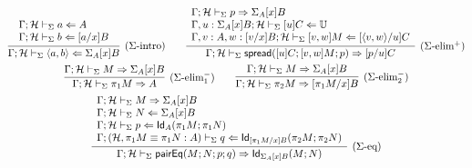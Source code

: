 \documentclass{amsart}
\begin{document}
\begin{gather*}
  \infer[\text{($\Sigma$-intro)}]{
    \Gamma;\mathcal{H}\vdash_\Sigma \langle a,b\rangle \checks \Sigma_A[x]B
  }{
    \begin{array}{l}
      \Gamma;\mathcal{H}\vdash_\Sigma a\checks A\\
      \Gamma;\mathcal{H}\vdash_\Sigma b\checks [a/x]B
    \end{array}
  }
  \qquad
  \infer[\text{($\Sigma$-elim$^+$)}]{
    \Gamma;\mathcal{H}\vdash_\Sigma \mathsf{spread}([u]C; [v,w]M; p)\infers [p/u]C
  }{
    \begin{array}{l}
      \Gamma;\mathcal{H}\vdash_\Sigma p\infers \Sigma_A[x]B\\
      \Gamma,u:\Sigma_A[x]B;\mathcal{H}\vdash_\Sigma [u]C\checks\uni\\
      \Gamma,v:A,w:[v/x]B;\mathcal{H}\vdash_\Sigma [v,w]M\checks[\langle v,w\rangle/u]C
    \end{array}
  }\\
  \infer[\text{($\Sigma$-elim$^-_1$)}]{
    \Gamma;\mathcal{H}\vdash_\Sigma \pi_1M\infers A
  }{
    \Gamma;\mathcal{H}\vdash_\Sigma M \infers \Sigma_A[x]B
  }
  \qquad
  \infer[\text{($\Sigma$-elim$^-_2$)}]{
    \Gamma;\mathcal{H}\vdash_\Sigma \pi_2M\infers [\pi_1M/x]B
  }{
    \Gamma;\mathcal{H}\vdash_\Sigma M\infers\Sigma_A[x]B
  }\\
  \infer[\text{($\Sigma$-eq)}]{
    \Gamma;\mathcal{H}\vdash_\Sigma \mathsf{pairEq}(M;N;p;q)\infers \mathsf{Id}_{\Sigma_A[x]B}(M; N)
  }{
    \begin{array}{l}
      \Gamma;\mathcal{H}\vdash_\Sigma M \infers \Sigma_A[x]B\\
      \Gamma;\mathcal{H}\vdash_\Sigma N \checks \Sigma_A[x]B\\
      \Gamma;\mathcal{H}\vdash_\Sigma p\checks \mathsf{Id}_A(\pi_1M;\pi_1N)\\
      \Gamma;(\mathcal{H}, \pi_1M\equiv\pi_1N:A)\vdash_\Sigma q\checks\mathsf{Id}_{[\pi_1M/x]B}(\pi_2M;\pi_2N)
    \end{array}
  }
\end{gather*}
\end{document}
